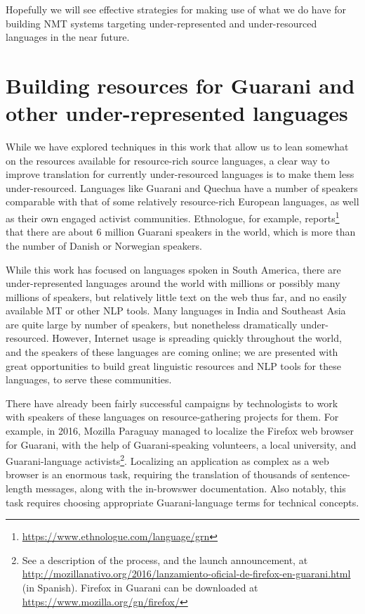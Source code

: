 Hopefully we will see effective strategies for making use of what we do have
for building NMT systems targeting under-represented and under-resourced
languages in the near future.

\section{Building resources for Guarani and other under-represented languages}
\label{sec:crowdsourcing}

While we have explored techniques in this work that allow us to lean
somewhat on the resources available for resource-rich source
languages, a clear way to improve translation for currently under-resourced
languages is to make them less under-resourced. Languages like Guarani and
Quechua have a number of speakers comparable with that of some relatively
resource-rich European languages, as well as their own engaged activist
communities. Ethnologue, for example,
reports\footnote{\url{https://www.ethnologue.com/language/grn}} that there are
about 6 million Guarani speakers in the world, which is more than the number of
Danish or Norwegian speakers.

While this work has focused on languages spoken in South America, there are
under-represented languages around the world with millions or possibly many
millions of speakers, but relatively little text on the web thus far, and no
easily available MT or other NLP tools. Many languages in India and Southeast
Asia are quite large by number of speakers, but nonetheless dramatically
under-resourced. However, Internet usage is spreading quickly throughout the
world, and the speakers of these languages are coming online; we are presented
with great opportunities to build great linguistic resources and NLP tools for
these languages, to serve these communities.

There have already been fairly successful campaigns by technologists to work
with speakers of these languages on resource-gathering projects for them. For
example, in 2016, Mozilla Paraguay managed to localize the Firefox web browser
for Guarani, with the help of Guarani-speaking volunteers, a local university,
and Guarani-language activists\footnote{See a description of the process, and
the launch announcement, at
\url{http://mozillanativo.org/2016/lanzamiento-oficial-de-firefox-en-guarani.html}
(in Spanish). Firefox in Guarani can be downloaded at
\url{https://www.mozilla.org/gn/firefox/}}. Localizing an application as
complex as a web browser is an enormous task, requiring the translation of
thousands of sentence-length messages, along with the in-browswer
documentation. Also notably, this task requires choosing appropriate
Guarani-language terms for technical concepts.

